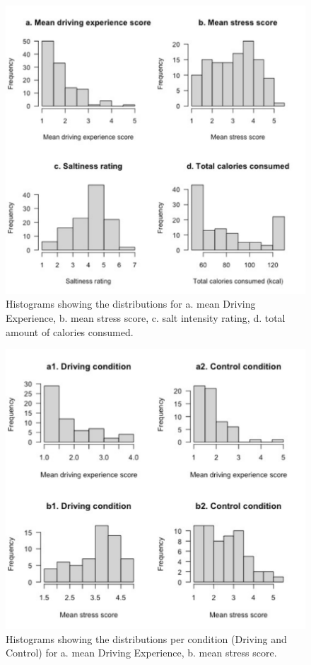 \documentclass[authordate, empirical, issue]{jote-new-article}
\begin{document}
\begin{figure}[h!]

  \includegraphics[width=.8\textwidth]{media/image3.pdf}
  \centering
  \caption{Histograms showing the distributions for a. mean Driving Experience, b. mean stress score, c. salt intensity rating, d. total amount of calories consumed.}

  \label{fig:rId25}
\end{figure}

\begin{figure}
  \centering
  \includegraphics[width=.7\textwidth]{media/image4.pdf}
  \caption{Histograms showing the distributions per condition (Driving and Control) for a. mean Driving Experience, b. mean stress score.}

  \label{fig:rId26}

\end{figure}
\end{document}
